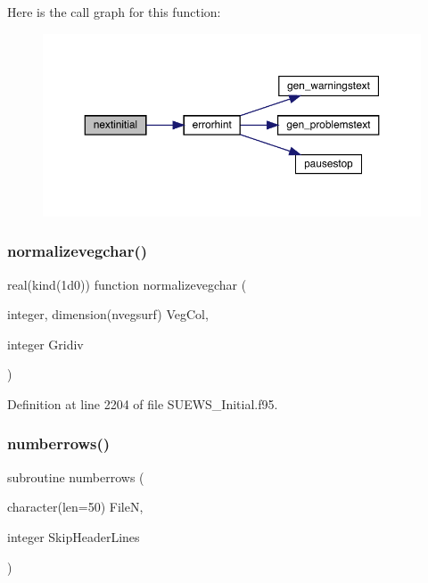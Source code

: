 Here is the call graph for this function\+:\nopagebreak
\begin{figure}[H]
\begin{center}
\leavevmode
\includegraphics[width=350pt]{_s_u_e_w_s___initial_8f95_acde97a1be2a58d77e93b4348c1595689_cgraph}
\end{center}
\end{figure}
\mbox{\label{_s_u_e_w_s___initial_8f95_abdf1692da63bcfb0be44f468cab89c10}} 
\subsubsection{\texorpdfstring{normalizevegchar()}{normalizevegchar()}}
{\footnotesize\ttfamily real(kind(1d0)) function normalizevegchar (\begin{DoxyParamCaption}\item[{integer, dimension(nvegsurf)}]{Veg\+Col,  }\item[{integer}]{Gridiv }\end{DoxyParamCaption})}



Definition at line 2204 of file S\+U\+E\+W\+S\+\_\+\+Initial.\+f95.

\mbox{\label{_s_u_e_w_s___initial_8f95_ae822e367ccfe96c8a005e1ca117059eb}} 
\subsubsection{\texorpdfstring{numberrows()}{numberrows()}}
{\footnotesize\ttfamily subroutine numberrows (\begin{DoxyParamCaption}\item[{character(len=50)}]{FileN,  }\item[{integer}]{Skip\+Header\+Lines }\end{DoxyParamCaption})}



